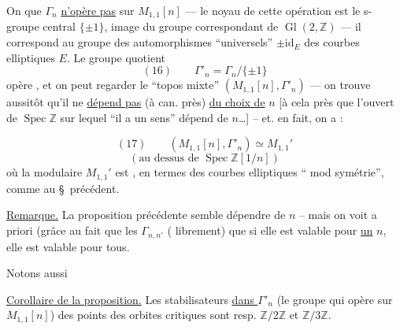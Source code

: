 
On  que $\Gamma_n$ \uline{n'opère pas}  sur $M_{1,1}[n]$ --- le noyau de cette opération est le s-groupe central $\{\pm1\}$, image du groupe correspondant de $\operatorname{Gl}(2,\mathbb Z)$ --- il correspond au groupe des automorphismes ``universels'' $\pm\mathrm{id}_E$ des courbes elliptiques $E$. Le groupe quotient
\[
(16)\qquad \Gamma'_n=\Gamma_n/\{\pm1\}
\]
 opère , et on peut regarder le ``topos mixte'' $(M_{1,1}[n],\Gamma'_n)$ --- on trouve
aussitôt qu'il ne \uline{dépend pas} (à  can. près) \uline{du choix de} $n$ [à cela près que l'ouvert de $\operatorname{Spec}\mathbb Z$ sur lequel ``il a un sens'' dépend de $n$\dots] -- et. en fait, on a :


\[
(17)\qquad (M_{1,1}[n],\Gamma'_n)\simeq M_{1,1}'
\]
\[
(\text{au dessus de }\operatorname{Spec}\mathbb Z[1/n])
\]
où la   modulaire $M_{1,1}'$ est , en termes des courbes elliptiques `` mod symétrie'', comme au \S\ précédent.

\uline{Remarque.} La proposition précédente semble dépendre de $n$ -- mais on voit a priori  (grâce au fait que les $\Gamma_{n,n'}$  ( librement) que si elle est valable pour \uline{un} $n$, elle est valable pour tous.

 Notons  aussi

\uline{Corollaire de la proposition.}  Les stabilisateurs \uline{dans $\Gamma'_n$} (le groupe qui opère \uline{} sur $M_{1,1}[n]$) des points des  orbites critiques sont resp. $\mathbb Z/2\mathbb Z$ et $\mathbb Z/3\mathbb Z$. 

